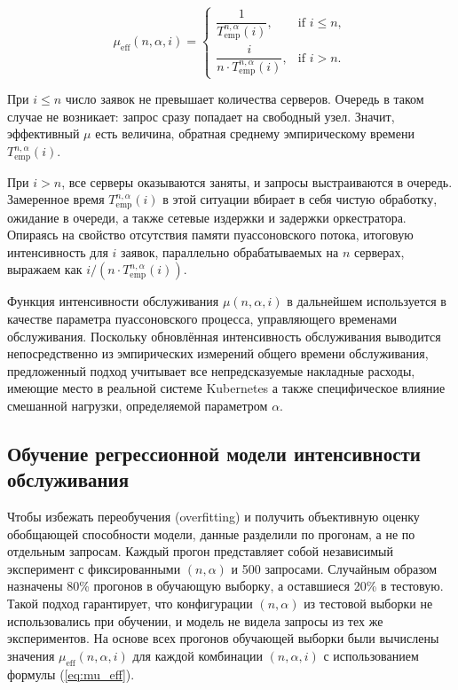 \documentclass[12pt,a4paper]{article}
\begin{document}
\begin{equation}
  \mu_{\mathrm{eff}}(n, \alpha, i) =
  \left\{
  \begin{array}{ll}
    \dfrac{1}{T_{\mathrm{emp}}^{n, \alpha}(i)},         & \text{if } i \le n, \\[12pt]
    \dfrac{i}{n \cdot T_{\mathrm{emp}}^{n, \alpha}(i)}, & \text{if } i > n.
  \end{array}
  \right.
  \label{eq:mu_eff}
\end{equation}

При $i \le n$ число заявок не превышает количества серверов. Очередь в таком случае не возникает: запрос сразу попадает на свободный узел. Значит, эффективный $\mu$ есть величина, обратная среднему эмпирическому времени $T_{\text{emp}}^{n, \alpha}(i)$.

При $i > n$, все серверы оказываются заняты, и запросы выстраиваются в очередь. Замеренное время $T_{\text{emp}}^{n, \alpha}(i)$ в этой ситуации вбирает в себя чистую обработку, ожидание в очереди, а также сетевые издержки и задержки оркестратора. Опираясь на свойство отсутствия памяти пуассоновского потока, итоговую интенсивность для $i$ заявок, параллельно обрабатываемых на $n$ серверах, выражаем как $i / (n \cdot T_{\text{emp}}^{n, \alpha}(i))$.

Функция интенсивности обслуживания $\mu(n, \alpha, i)$ в дальнейшем используется в качестве параметра пуассоновского процесса, управляющего временами обслуживания. Поскольку обновлённая интенсивность обслуживания выводится непосредственно из эмпирических измерений общего времени обслуживания, предложенный подход учитывает все непредсказуемые накладные расходы, имеющие место в реальной системе Kubernetes а также специфическое влияние смешанной нагрузки, определяемой параметром $\alpha$.

\subsection{Обучение регрессионной модели интенсивности обслуживания}

Чтобы избежать переобучения (overfitting) и получить объективную оценку обобщающей способности модели, данные разделили по прогонам, а не по отдельным запросам. Каждый прогон представляет собой независимый эксперимент с фиксированными $(n, \alpha)$ и 500 запросами. Случайным образом назначены 80\% прогонов в обучающую выборку, а оставшиеся 20\% в тестовую. Такой подход гарантирует, что конфигурации $(n, \alpha)$ из тестовой выборки не использовались при обучении, и модель не видела запросы из тех же экспериментов. На основе всех прогонов обучающей выборки были вычислены значения $\mu_{\text{eff}}(n, \alpha, i)$ для каждой комбинации $(n, \alpha, i)$ с использованием формулы (\eqref{eq:mu_eff}).
\end{document}
